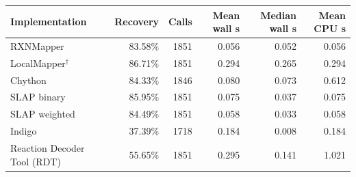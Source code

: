\begin{tabular}{@{}lrrrrr@{}}\toprule
Implementation & Recovery & Calls & Mean wall s & Median wall s & Mean CPU s\\\midrule
RXNMapper & 83.58\% & 1851 & 0.056 & 0.052 & 0.056\\
LocalMapper$^{\dagger}$ & 86.71\% & 1851 & 0.294 & 0.265 & 0.294\\
Chython & 84.33\% & 1846 & 0.080 & 0.073 & 0.612\\
SLAP binary & 85.95\% & 1851 & 0.075 & 0.037 & 0.075\\
SLAP weighted & 84.49\% & 1851 & 0.058 & 0.033 & 0.058\\
Indigo & 37.39\% & 1718 & 0.184 & 0.008 & 0.184\\
Reaction Decoder Tool (RDT) & 55.65\% & 1851 & 0.295 & 0.141 & 1.021\\
\bottomrule\end{tabular}
